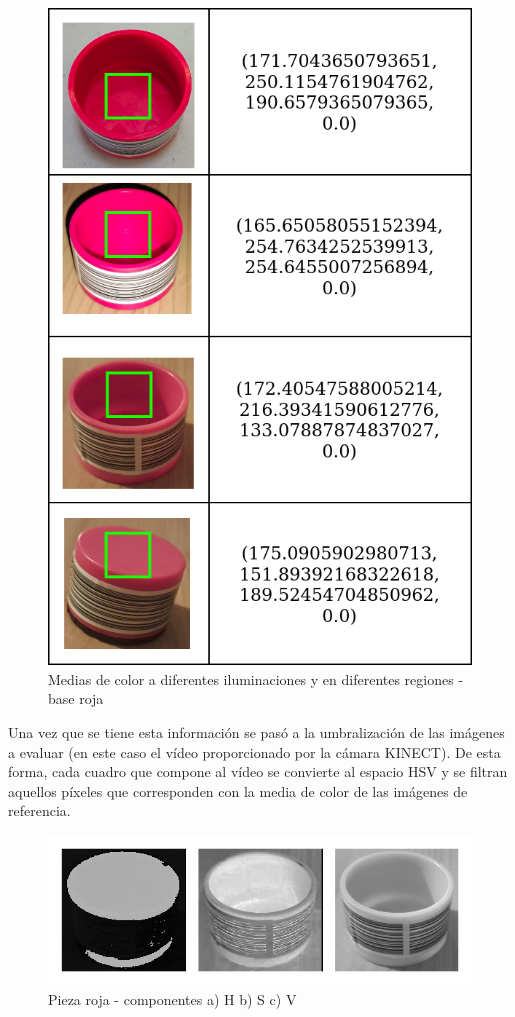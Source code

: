 \begin{figure}[ht]
\centering
\includegraphics[scale= 0.35]{Figures/Tabla_Medias_Ilum.png}
    \caption{Medias de color a diferentes iluminaciones y en diferentes regiones - base roja}
    \label{fig:RedPiece_MeanHSV}
\end{figure}

Una vez que se tiene esta información se pasó a la umbralización de las imágenes a evaluar (en este caso el vídeo proporcionado por la cámara KINECT). De esta forma, cada cuadro que compone al vídeo se convierte al espacio HSV y se filtran aquellos píxeles que corresponden con la media de color de las imágenes de referencia. 

\begin{figure}[ht]
\centering
\includegraphics[scale= 0.3]{Figures/RedPiece_HSV_components.png}
    \caption{Pieza roja - componentes a) H b) S c) V}
    \label{fig:RedPiece_HSV}
\end{figure}

